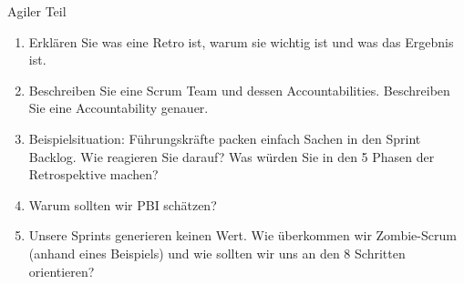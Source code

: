 \documentclass{article}
\begin{document}
\begin{exercise}{Agiler Teil}
  \begin{enumerate}
    \item Erklären Sie was eine Retro ist, warum sie wichtig ist und was das Ergebnis ist.
    \item Beschreiben Sie eine Scrum Team und dessen Accountabilities. Beschreiben Sie eine Accountability genauer.
    \item Beispielsituation: Führungskräfte packen einfach Sachen in den Sprint Backlog. Wie reagieren Sie darauf? Was würden Sie in den 5 Phasen der Retrospektive machen?
    \item Warum sollten wir PBI schätzen?
    \item Unsere Sprints generieren keinen Wert. Wie überkommen wir Zombie-Scrum (anhand eines Beispiels) und wie sollten wir uns an den 8 Schritten orientieren?
  \end{enumerate}


\end{exercise}
\end{document}
